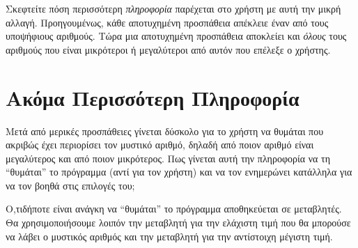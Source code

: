 \documentclass[a4paper,11pt,oneside]{book}
\begin{document}
Σκεφτείτε πόση περισσότερη \emph{πληροφορία} παρέχεται στο χρήστη με αυτή την μικρή αλλαγή. Προηγουμένως, κάθε αποτυχημένη προσπάθεια απέκλειε έναν από τους υποψήφιους αριθμούς. Τώρα μια αποτυχημένη προσπάθεια αποκλείει και \emph{όλους} τους αριθμούς που είναι μικρότεροι ή μεγαλύτεροι από αυτόν που επέλεξε ο χρήστης. 




\section{Ακόμα Περισσότερη Πληροφορία}

\begin{question}
Μετά από μερικές προσπάθειες γίνεται δύσκολο για το χρήστη να θυμάται που ακριβώς έχει περιορίσει
τον μυστικό αριθμό, δηλαδή από ποιον αριθμό είναι μεγαλύτερος και από ποιον μικρότερος.
Πως γίνεται αυτή την πληροφορία να τη ``θυμάται'' το πρόγραμμα (αντί για τον χρήστη) και να τον
ενημερώνει κατάλληλα για να τον βοηθά στις επιλογές του;
\end{question}

Ο,τιδήποτε είναι ανάγκη να ``θυμάται'' το πρόγραμμα αποθηκεύεται σε μεταβλητές. Θα χρησιμοποιήσουμε λοιπόν την μεταβλητή  για την ελάχιστη τιμή που θα μπορούσε να λάβει ο μυστικός αριθμός και την μεταβλητή  για την αντίστοιχη μέγιστη τιμή.
\end{document}
